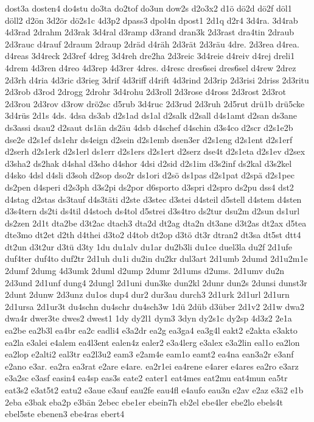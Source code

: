 {dost3a
dosten4
do4stu
do3ta
do2tof
do3un
dow2s
d2o3x2
d1ö
dö2d
dö2f
döl1
döll2
d2ön
3d2ör
dö2s1c
4d3p2
dpass3
dpol4n
dpost1
2d1q
d2r4
3d4ra.
3d4rab
4d3rad
2drahm
2d3rak
3d4ral
d3ramp
d3rand
dran3k
2d3rast
dra4tin
2draub
2d3rauc
d4rauf
2draum
2draup
2dräd
d4räh
2d3rät
2d3räu
4dre.
2d3rea
d4rea.
d4reas
3d4reck
2d3ref
4dreg
3d4reh
dre2ha
2d3reic
3d4reie
d4reiv
d4rej
dreli1
4drem
4d3ren
d4reo
4d3rep
4d3rer
4dres.
d4resc
dres6sei
dres6sel
d4rew
2drez
2d3rh
d4ria
4d3ric
d3rieg
3drif
4d3riff
d4rift
4d3rind
2d3rip
2d3risi
2driss
2d3ritu
2d3rob
d3rod
2drogg
2drohr
3d4rohu
2d3roll
2d3rose
d4ross
2d3rost
2d3rot
2d3rou
2d3rov
d3row
drö2sc
d5rub
3d4ruc
2d3rud
2d3ruh
2d5rut
drü1b
drü5cke
3d4rüs
2d1s
4ds.
4dsa
ds3ab
d2s1ad
ds1al
d2salk
d2sall
d4s1amt
d2san
ds3ane
ds3assi
dsau2
d2saut
ds1än
ds2äu
4dsb
d4schef
d4schin
d3s4co
d2scr
d2s1e2b
dse2e
d2s1ef
ds1ehr
ds4eign
d2sein
d2s1emb
dsen3er
d2s1eng
d2s1ent
d2s1erf
d2serh
d2s1erk
d2s1erl
ds1err
d2s1ers
d2s1ert
d2serz
dse4t
d2s1eta
d2s1ev
d2sex
d3sha2
ds2hak
d4shal
d3sho
d4shor
4dsi
d2sid
d2s1im
d3s2inf
ds2kal
d3s2kel
d4sko
4dsl
d4sli
d3soh
d2sop
dso2r
ds1ori
d2sö
ds1pas
d2s1pat
d2spä
d2s1pec
ds2pen
d4speri
d2s3ph
d3s2pi
ds2por
d6sporto
d3spri
d2spro
ds2pu
dss4
dst2
d4stag
d2stas
ds3tauf
d4s3täti
d2ste
d3stec
d3stei
d4steil
d5stell
d4stem
d4sten
d3s4tern
ds2ti
ds4til
d4stoch
ds4tol
d5strei
d3s4tro
ds2tur
dsu2m
d2sun
ds1url
ds2zen
2d1t
dta2be
d3t2ac
dtach3
dta2d
dt2ag
dta2n
dt3ane
d3t2as
dt2ax
d5tea
dte3mo
dt2et
d2th
d4thei
d3to2
d4tob
dt2op
d3tö
dt3r
dtran2
dt3sa
dt5st
dtt4
dt2un
d3t2ur
d3tü
d3ty
1du
du1alv
du1ar
du2b3li
du1ce
duel3la
du2f
2d1ufe
duf4ter
duf4to
duf2tr
2d1uh
du1i
du2in
du2kr
dul3art
2d1umb
2dumd
2d1u2m1e
2dumf
2dumg
4d3umk
2duml
d2ump
2dumr
2d1ums
d2ums.
2d1umv
du2n
2d3und
2d1unf
dung4
2dungl
2d1uni
dun3ke
dun2kl
2dunr
dun2s
2dunsi
dunst3r
2dunt
2dunw
2d3unz
du1os
dup4
dur2
dur3au
durch3
2d1urk
2d1url
2d1urn
2d1ursa
2d1ur3t
du4schn
du4schr
du4sch3w
1dü
2düb
d3über
2d1v2
2d1w
dwa2
dwa4r
dwer3te
dwes2
dwest1
1dy
dy2l1
dym3
3dyn
dy2s1c
dy2sp
4d3z2
2e1a
ea2be
ea2b3l
ea4br
ea2c
eadli4
e3a2dr
ea2g
ea3ga4
ea3g4l
eakt2
e2akta
e3akto
ea2la
e3alei
e4alem
ea4l3ent
ealen4z
ealer2
e3a4lerg
e3alex
e3a2lin
eal1o
ea2lon
ea2lop
e2alti2
eal3tr
ea2l3u2
eam3
e2am4e
eam1o
eamt2
ea4na
ean3a2r
e3anf
e2ano
e3ar.
ea2ra
ea3rat
e2are
e4are.
ea2r1ei
ea4rene
e4arer
e4ares
ea2ro
e3arz
e3a2sc
e3asf
easin4
ea4sp
eas3s
eate2
eater1
eat4mes
eat2mu
eat4mun
ea5tr
eat3s2
e3at5t2
eatu2
e3aue
e3auf
eau2fe
eau4fl
e4aufo
eau3n
e2av
e2az
e3ä2
e1b
2eba
e3bak
eba2p
e3bän
2ebec
ebe1er
ebein7h
eb2el
ebe4ler
ebe2lo
ebels4t
ebel5ste
ebenen3
ebe4ras
ebert4
}
